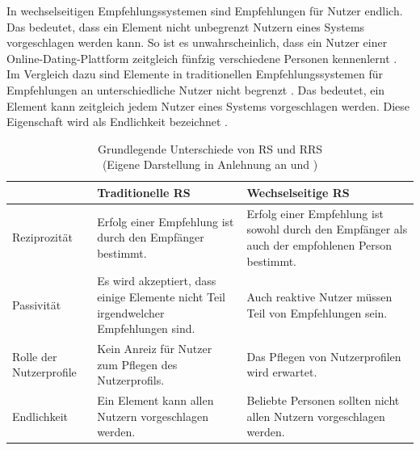 In wechselseitigen Empfehlungssystemen sind Empfehlungen für Nutzer endlich.
Das bedeutet, dass ein Element nicht unbegrenzt Nutzern eines Systems vorgeschlagen werden kann.
So ist es unwahrscheinlich, dass ein Nutzer einer Online-Dating-Plattform zeitgleich fünfzig verschiedene Personen kennenlernt \cite[S. 35]{li:inproceedings}.
Im Vergleich dazu sind Elemente in traditionellen Empfehlungssystemen für Empfehlungen an unterschiedliche Nutzer nicht begrenzt \cite[S. 1468]{yildirim:article}.
Das bedeutet, ein Element kann zeitgleich jedem Nutzer eines Systems vorgeschlagen werden.
Diese Eigenschaft wird als Endlichkeit bezeichnet \cite[S. 35]{li:inproceedings}.

\begin{table}[htbp]
    \begin{center}
        \begin{tabular}{|p{}||p{}|p{}|}
            \hline
             & {\textbf{Traditionelle \ac{RS}}} & {\textbf{Wechselseitige \ac{RS}}} \\
            \hline
            \hline
            Reziprozität & Erfolg einer Empfehlung ist durch den Empfänger bestimmt. &  Erfolg einer Empfehlung ist sowohl durch den Empfänger als auch der empfohlenen Person bestimmt. \\
            \hline
            Passivität & Es wird akzeptiert, dass einige Elemente nicht Teil irgendwelcher Empfehlungen sind. &  Auch reaktive Nutzer müssen Teil von Empfehlungen sein. \\
            \hline
            Rolle der Nutzerprofile & Kein Anreiz für Nutzer zum Pflegen des Nutzerprofils. &  Das Pflegen von Nutzerprofilen wird erwartet. \\
            \hline
            Endlichkeit & Ein Element kann allen Nutzern vorgeschlagen werden. & Beliebte Personen sollten nicht allen Nutzern vorgeschlagen werden. \\
            \hline
    \end{tabular}
    \end{center}
    \caption[Grundlegende Unterschiede von RS und RRS]{Grundlegende Unterschiede von RS und RRS \\
	(Eigene Darstellung in Anlehnung an \cite[S. 546]{koprinska:inbook} und \cite[S. 35f.]{li:inproceedings})}
	\label{tab2}
\end{table}

